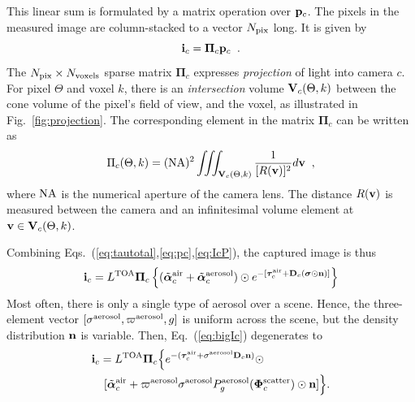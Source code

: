 \documentclass[10pt,twocolumn,letterpaper]{article}
\newcommand{\vect}[1]{\bm{#1}}
\begin{document}
This linear sum is formulated by a matrix operation over ${\bf p}_c$. 
The pixels in the measured image are column-stacked to a vector 
$N_{\rm pix}$ long. It is given by
\begin{equation}
 {\bf i}_c= {\vect{\Pi}}_c{\bf p}_c
  \;\;.
  \label{eq:IcP}
\end{equation}
The $N_{\rm pix}\times N_{\rm voxels}$ sparse matrix ${\vect{\Pi}}_c$  
expresses {\em projection} of light into camera $c$.
For pixel $\Theta$ and voxel $k$, there is an {\em intersection} volume ${\bf V}_c(\Theta,k)$ between the cone volume of the pixel's field of view, and the voxel, as illustrated in Fig.~\ref{fig:projection}. The corresponding element in the matrix ${\vect{\Pi}}_c$ can be written as
\begin{equation}
 \Pi_c(\Theta,k)=({\rm NA})^2
     \iiint_{{\bf V}_c(\Theta,k)}
     \frac{1}{[R({\bf v})]^2} d{\bf v}
  \;\;,
  \label{eq:Pc}
\end{equation}
where ${\rm NA}$ is the numerical aperture of the camera lens. The distance $R({\bf v})$ is measured between the camera and an infinitesimal volume element at ${\bf v}\in {\bf V}_c(\Theta,k)$.

Combining Eqs.~(\ref{eq:tautotal},\ref{eq:pc},\ref{eq:IcP}), the captured image is thus
\begin{align}
 {\bf i}_c= L^{\rm TOA}
    {\vect{\Pi}}_c
          \left\{
          (\tilde{\vect{\alpha}}^{\rm air}_c + \tilde{\vect{\alpha}}^{\rm aerosol}_c)
           \odot
            e^{-[\vect{\tau}_c^{\rm air}
               + {\bf D}_c (\vect{\sigma} \odot {\bf n})]}
           \right\}
  \label{eq:bigIc}
\end{align}
Most often, there is only a single type of aerosol over a scene. Hence, the three-element
vector $[{\sigma}^{\rm aerosol},\varpi^{\rm aerosol},g]$ is uniform across the scene, but the density distribution ${\bf n}$ is variable. Then, Eq.~(\ref{eq:bigIc}) degenerates to
\begin{align}
 {\bf i}_c= L^{\rm TOA}
    {\vect{\Pi}}_c
          \Big\{
            e^{-(\vect{\tau}_c^{\rm air}
                  + {\sigma}^{\rm aerosol} {\bf D}_c {\bf n})
              }\odot
  \;\;\;\;\;\;\;\;\;\;\;\;\;\;\;\;\;\;\;\;\;
     \nonumber \\
           [\tilde{\vect{\alpha}}^{\rm air}_c + %
           \varpi^{\rm aerosol}\sigma^{\rm aerosol}
           P^{\rm aerosol}_g(\vect{\Phi}^{\rm scatter}_c)
           \odot{\bf n}
           ]
           \Big\}
           .
  \label{eq:bigIA}
\end{align}
\end{document}
